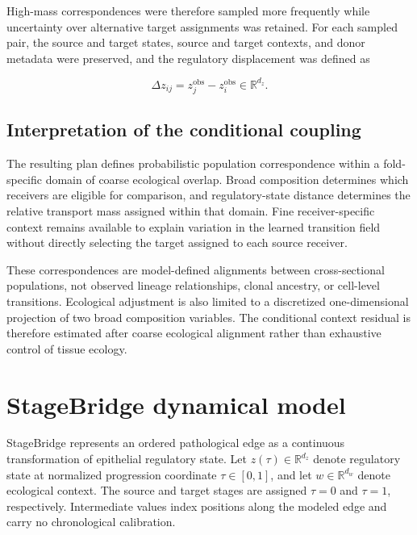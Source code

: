 High-mass correspondences were therefore sampled more frequently while
uncertainty over alternative target assignments was retained. For each sampled
pair, the source and target states, source and target contexts, and donor
metadata were preserved, and the regulatory displacement was defined as

\begin{equation}
\Delta z_{ij}
=
z_j^{\mathrm{obs}}
-
z_i^{\mathrm{obs}}
\in
\mathbb{R}^{d_z}.
\label{eq:methods-pair-displacement}
\end{equation}

\subsection{Interpretation of the conditional coupling}
\label{sec:methods-coupling-interpretation}

The resulting plan defines probabilistic population correspondence within a
fold-specific domain of coarse ecological overlap. Broad composition determines
which receivers are eligible for comparison, and regulatory-state distance
determines the relative transport mass assigned within that domain. Fine
receiver-specific context remains available to explain variation in the learned
transition field without directly selecting the target assigned to each source
receiver.

These correspondences are model-defined alignments between cross-sectional
populations, not observed lineage relationships, clonal ancestry, or cell-level
transitions. Ecological adjustment is also limited to a discretized
one-dimensional projection of two broad composition variables. The conditional
context residual is therefore estimated after coarse ecological alignment
rather than exhaustive control of tissue ecology.


\section{StageBridge dynamical model}
\label{sec:methods-field}

StageBridge represents an ordered pathological edge as a continuous
transformation of epithelial regulatory state. Let
\(z(\tau)\in\mathbb{R}^{d_z}\) denote regulatory state at normalized progression
coordinate \(\tau\in[0,1]\), and let \(w\in\mathbb{R}^{d_w}\) denote ecological
context. The source and target stages are assigned \(\tau=0\) and \(\tau=1\),
respectively. Intermediate values index positions along the modeled edge and
carry no chronological calibration.

